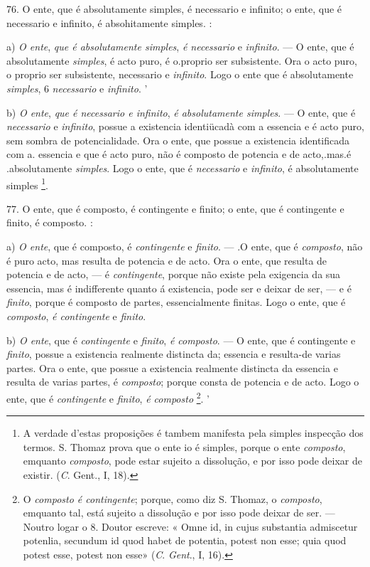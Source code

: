 76. O ente, que é absolutamente simples, é necessario e infinito; o ente, que é necessario e infinito, é absohitamente simples. :

a) \emph{O ente}, \emph{que é absolutamente simples}, \emph{é necessario} e \emph{infinito}. --- O ente, que é absolutamente \emph{simples}, é acto puro, é o.proprio ser subsistente. Ora o acto puro, o proprio ser subsistente, necessario e \emph{infinito}. Logo o ente que é absolutamente \emph{simples}, \textbar{} 6 \emph{necessario} e \emph{infinito}. '

b) \emph{O ente}, \emph{que é necessario e infinito}, \emph{é absolutamente simples}. --- O ente, que é \emph{necessario} e \emph{infinito}, possue a existencia   identiücadà com a essencia e é acto puro, sem sombra de potencialidade. Ora o ente, que possue a existencia identificada com a. essencia e que é acto puro, não é composto de potencia e de acto,.mas.é .absolutamente \emph{simples}. Logo o ente, que é \emph{necessario} e \emph{infinito}, é absolutamente simples \footnote{A verdade d'estas proposições é tambem manifesta pela simples inspecção dos termos. S. Thomaz prova que o ente io é simples, porque o ente \emph{composto}, emquanto \emph{composto}, pode estar sujeito a dissolução, e por isso pode deixar de existir. (\emph{C}. Gent., I, 18).}.

77. O ente, que é composto, é contingente e finito; o ente, que é contingente e finito, é composto. :

a) \emph{O ente}, que é composto, é \emph{contingente} e \emph{finito}. --- .O ente, que é \emph{composto}, não é puro acto, mas resulta de potencia e de acto. Ora o ente, que resulta de potencia e de acto, --- é \emph{contingente}, porque não existe pela exigencia da sua essencia, mas é indifferente quanto á existencia, pode ser e deixar de ser, --- e é \emph{finito}, porque é composto de partes, essencialmente finitas. Logo o ente, que é \emph{composto}, \emph{é contingente} e \emph{finito}.

b) \emph{O ente}, que é \emph{contingente} e \emph{finito}, \emph{é composto}. --- O ente, que é contingente e \emph{finito}, possue a existencia realmente distincta da; essencia e resulta-de varias partes. Ora o ente, que possue a existencia realmente distincta da essencia e resulta de varias partes, é \emph{composto}; porque consta de potencia e de acto. Logo o ente, que é \emph{contingente} e \emph{finito}, \emph{é composto} \footnote{O \emph{composto é contingente}; porque, como diz S. Thomaz, o \emph{composto}, emquanto tal, está sujeito a dissolução e por isso pode deixar de ser. --- Noutro logar o 8. Doutor escreve: « Omne id, in cujus substantia admiscetur potenlia, secundum id quod habet de potentia, potest non esse; quia quod potest esse, potest non esse» (\emph{C}. \emph{Gent}., I, 16).}. '

